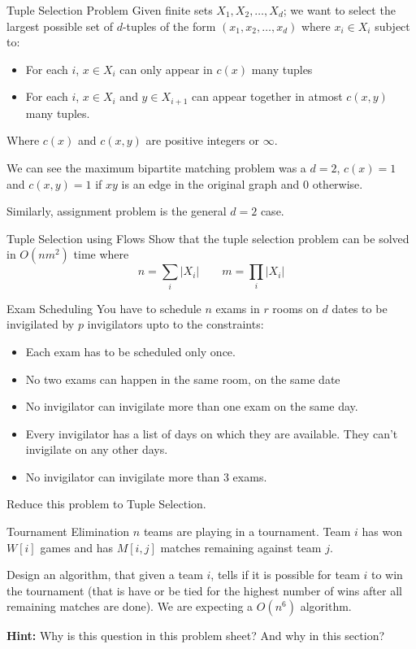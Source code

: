 \documentclass[aspectratio=169,11pt]{beamer}
\newcommand{\blankslides}{%
  \begin{frame}[plain]\end{frame}%
  \begin{frame}[plain]\end{frame}%
}
\begin{document}
\begin{frame}{Tuple Selection Problem}
Given finite sets $X_1,X_2,\dots,X_d$; we want to select the largest possible set of $d$-tuples of the form
$(x_1,x_2,\dots,x_d)$ where $x_i\in X_i$ subject to:
\begin{itemize}
  \item For each $i$, $x\in X_i$ can only appear in $c(x)$ many tuples
  \item For each $i$, $x\in X_i$ and $y\in X_{i+1}$ can appear together in atmost $c(x,y)$ many tuples.
\end{itemize}
Where $c(x)$ and $c(x,y)$ are positive integers or $\infty$.

\medskip
We can see the maximum bipartite matching problem was a $d=2$, $c(x)=1$ and $c(x,y)=1$ if $xy$ is an edge
in the original graph and $0$ otherwise.

\medskip
Similarly, assignment problem is the general $d=2$ case.
\end{frame}

\begin{frame}{Tuple Selection using Flows}
Show that the tuple selection problem can be solved in $O(nm^2)$ time where
\[
  n=\sum_i |X_i| \qquad m=\prod_i |X_i|
\]
\end{frame}
\blankslides

\begin{frame}{Exam Scheduling}
You have to schedule $n$ exams in $r$ rooms on $d$ dates to be invigilated by $p$ invigilators upto to
the constraints:
\begin{itemize}
  \item Each exam has to be scheduled only once.
  \item No two exams can happen in the same room, on the same date
  \item No invigilator can invigilate more than one exam on the same day.
  \item Every invigilator has a list of days on which they are available. They can't invigilate on any other days.
  \item No invigilator can invigilate more than 3 exams.
\end{itemize}
Reduce this problem to Tuple Selection.
\end{frame}
\blankslides

\begin{frame}{Tournament Elimination}
$n$ teams are playing in a tournament. Team $i$ has won $W[i]$ games and has $M[i,j]$ matches remaining
against team $j$.

\medskip
Design an algorithm, that given a team $i$, tells if it is possible for team $i$ to win the tournament
(that is have or be tied for the highest number of wins after all remaining matches are done). We are
expecting a $O(n^6)$ algorithm.

\medskip
\textbf{Hint:} Why is this question in this problem sheet? And why in this section?
\end{frame}
\blankslides
\end{document}
